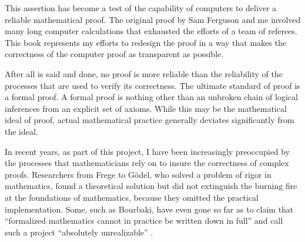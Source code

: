 This assertion has become a test of the capability of
computers to deliver a reliable mathematical proof.  The original
proof by Sam Ferguson and me involved many long computer calculations
that exhausted the efforts of a team of referees.  This book represents my efforts
to redesign the proof in a way that makes the correctness of the computer proof as transparent
as possible.

After all is said and done, no proof is more reliable than the
reliability of the processes that are used to verify its
correctness.   The ultimate standard of proof is a formal proof.  A formal proof
is nothing other than an unbroken chain of logical inferences from an explicit set
of axioms.  While this may be the mathematical ideal of proof, actual mathematical
practice generally deviates significantly from the ideal.



%
%
%
%

In recent years, as part of this project, I have been increasingly preoccupied by the
processes that mathematicians rely on to insure the correctness of complex
proofs. Researchers from Frege to G\"odel, who solved a problem of
rigor in mathematics, found a theoretical solution but did not
extinguish the burning fire at the foundations of mathematics,
because they omitted the practical implementation. Some, such as
Bourbaki, have even gone so far as to claim that ``formalized
mathematics cannot in practice be written down in full'' and call
such a project
``absolutely unrealizable'' \cite[p 10,11]{Bour:68:Sets}. %

